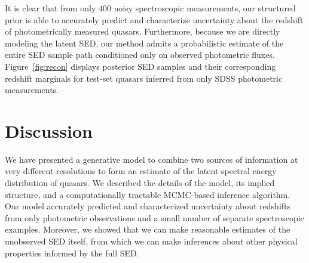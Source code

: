 \documentclass{article}
\newcommand{\red}[1]{\textcolor{red}{[TODO: #1]}}
\begin{document}
It is clear that from only $400$ noisy spectroscopic measurements, our structured prior is able to accurately predict and characterize uncertainty about the redshift of photometrically measured quasars.  
Furthermore, because we are directly modeling the latent SED, our method admits a probabilistic estimate of the entire SED sample path conditioned only on observed photometric fluxes.  Figure~\ref{fig:recon} displays posterior SED samples and their corresponding redshift marginals for test-set quasars inferred from only SDSS photometric measurements.  


\section{Discussion}
We have presented a generative model to combine two sources of information at very different resolutions to form an estimate of the latent spectral energy distribution of quasars.  We described the details of the model, its implied structure, and a computationally tractable MCMC-based inference algorithm. 
Our model accurately predicted and characterized uncertainty about redshifts from only photometric observations and a small number of separate spectroscopic examples. 
Moreover, we showed that we can make reasonable estimates of the unobserved SED itself, from which we can make inferences about other physical properties informed by the full SED.  
 
\end{document}
